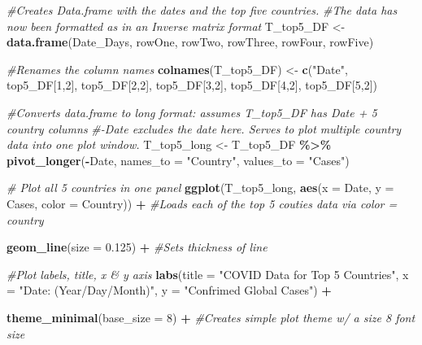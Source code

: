 \documentclass[
]{article}
\newenvironment{Shaded}{\begin{snugshade}}{\end{snugshade}}
\newcommand{\AttributeTok}[1]{\textcolor[rgb]{0.13,0.29,0.53}{#1}}
\newcommand{\CommentTok}[1]{\textcolor[rgb]{0.56,0.35,0.01}{\textit{#1}}}
\newcommand{\DecValTok}[1]{\textcolor[rgb]{0.00,0.00,0.81}{#1}}
\newcommand{\FloatTok}[1]{\textcolor[rgb]{0.00,0.00,0.81}{#1}}
\newcommand{\FunctionTok}[1]{\textcolor[rgb]{0.13,0.29,0.53}{\textbf{#1}}}
\newcommand{\NormalTok}[1]{#1}
\newcommand{\OtherTok}[1]{\textcolor[rgb]{0.56,0.35,0.01}{#1}}
\newcommand{\SpecialCharTok}[1]{\textcolor[rgb]{0.81,0.36,0.00}{\textbf{#1}}}
\newcommand{\StringTok}[1]{\textcolor[rgb]{0.31,0.60,0.02}{#1}}
\begin{document}
\begin{Shaded}
\begin{Highlighting}[]
\CommentTok{\#Creates Data.frame with the dates and the top five countries.}
\CommentTok{\#The data has now been formatted as in an Inverse matrix format}
\NormalTok{T\_top5\_DF }\OtherTok{\textless{}{-}} \FunctionTok{data.frame}\NormalTok{(Date\_Days, rowOne, rowTwo, rowThree, rowFour, rowFive)}

\CommentTok{\#Renames the column names}
\FunctionTok{colnames}\NormalTok{(T\_top5\_DF) }\OtherTok{\textless{}{-}} \FunctionTok{c}\NormalTok{(}\StringTok{"Date"}\NormalTok{, top5\_DF[}\DecValTok{1}\NormalTok{,}\DecValTok{2}\NormalTok{], top5\_DF[}\DecValTok{2}\NormalTok{,}\DecValTok{2}\NormalTok{], top5\_DF[}\DecValTok{3}\NormalTok{,}\DecValTok{2}\NormalTok{], top5\_DF[}\DecValTok{4}\NormalTok{,}\DecValTok{2}\NormalTok{], top5\_DF[}\DecValTok{5}\NormalTok{,}\DecValTok{2}\NormalTok{])}

\CommentTok{\#Converts data.frame to long format: assumes T\_top5\_DF has Date + 5 country columns}
\CommentTok{\#{-}Date excludes the date here. Serves to plot multiple country data into one plot window. }
\NormalTok{T\_top5\_long }\OtherTok{\textless{}{-}}\NormalTok{ T\_top5\_DF }\SpecialCharTok{\%\textgreater{}\%}
  \FunctionTok{pivot\_longer}\NormalTok{(}\SpecialCharTok{{-}}\NormalTok{Date, }\AttributeTok{names\_to =} \StringTok{"Country"}\NormalTok{, }\AttributeTok{values\_to =} \StringTok{"Cases"}\NormalTok{)}



\CommentTok{\# Plot all 5 countries in one panel}
\FunctionTok{ggplot}\NormalTok{(T\_top5\_long, }\FunctionTok{aes}\NormalTok{(}\AttributeTok{x =}\NormalTok{ Date, }\AttributeTok{y =}\NormalTok{ Cases, }\AttributeTok{color =}\NormalTok{ Country)) }\SpecialCharTok{+} \CommentTok{\#Loads each of the top 5 couties data via color = country}

  \FunctionTok{geom\_line}\NormalTok{(}\AttributeTok{size =} \FloatTok{0.125}\NormalTok{) }\SpecialCharTok{+} \CommentTok{\#Sets thickness of line}

  \CommentTok{\#Plot labels, title, x \& y axis}
  \FunctionTok{labs}\NormalTok{(}\AttributeTok{title =} \StringTok{"COVID Data for Top 5 Countries"}\NormalTok{, }\AttributeTok{x =} \StringTok{"Date: (Year/Day/Month)"}\NormalTok{, }\AttributeTok{y =} \StringTok{"Confrimed Global Cases"}\NormalTok{) }\SpecialCharTok{+} 

  \FunctionTok{theme\_minimal}\NormalTok{(}\AttributeTok{base\_size =} \DecValTok{8}\NormalTok{) }\SpecialCharTok{+} \CommentTok{\#Creates simple plot theme w/ a size 8 font size}


\end{Highlighting}
\end{Shaded}
\end{document}

